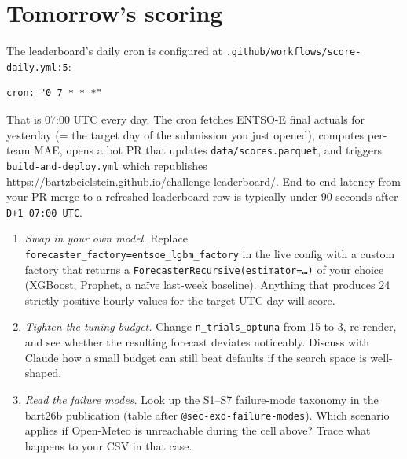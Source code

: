 \documentclass[
  english,
  letterpaper,
]{scrbook}
\providecommand{\tightlist}{%
  \setlength{\itemsep}{0pt}\setlength{\parskip}{0pt}}
\begin{document}
\section{Tomorrow's scoring}\label{sec-live-cron}

The leaderboard's daily cron is configured at
\texttt{.github/workflows/score-daily.yml:5}:

\begin{verbatim}
cron: "0 7 * * *"
\end{verbatim}

That is 07:00 UTC every day. The cron fetches ENTSO-E final actuals for
yesterday (= the target day of the submission you just opened), computes
per-team MAE, opens a bot PR that updates \texttt{data/scores.parquet},
and triggers \texttt{build-and-deploy.yml} which republishes
\url{https://bartzbeielstein.github.io/challenge-leaderboard/}.
End-to-end latency from your PR merge to a refreshed leaderboard row is
typically under 90 seconds after \texttt{D+1\ 07:00\ UTC}.

\begin{tcolorbox}[enhanced jigsaw, arc=.35mm, bottomrule=.15mm, bottomtitle=1mm, breakable, colback=white, colbacktitle=quarto-callout-tip-color!10!white, colframe=quarto-callout-tip-color-frame, coltitle=black, left=2mm, leftrule=.75mm, opacityback=0, opacitybacktitle=0.6, rightrule=.15mm, title=\textcolor{quarto-callout-tip-color}{\faLightbulb}\hspace{0.5em}{Exercises (with Claude)}, titlerule=0mm, toprule=.15mm, toptitle=1mm]

\begin{enumerate}
\def\labelenumi{\arabic{enumi}.}
\tightlist
\item
  \emph{Swap in your own model.} Replace
  \texttt{forecaster\_factory=entsoe\_lgbm\_factory} in the live config
  with a custom factory that returns a
  \texttt{ForecasterRecursive(estimator=…)} of your choice (XGBoost,
  Prophet, a naïve last-week baseline). Anything that produces 24
  strictly positive hourly values for the target UTC day will score.
\item
  \emph{Tighten the tuning budget.} Change \texttt{n\_trials\_optuna}
  from 15 to 3, re-render, and see whether the resulting forecast
  deviates noticeably. Discuss with Claude how a small budget can still
  beat defaults if the search space is well-shaped.
\item
  \emph{Read the failure modes.} Look up the S1--S7 failure-mode
  taxonomy in the bart26b publication (table after
  \texttt{@sec-exo-failure-modes}). Which scenario applies if Open-Meteo
  is unreachable during the cell above? Trace what happens to your CSV
  in that case.
\end{enumerate}

\end{tcolorbox}
\end{document}
